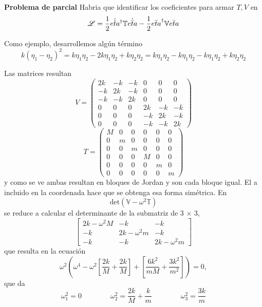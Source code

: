 \documentclass[10pt,oneside]{CBFT_book}
\begin{document}
\begin{ejemplo}{\bf Problema de parcial}
Habria que identificar los coeficientes para armar $T,V$ en 
\[
	\mathscr{L} = \frac{1}{2} \dot{\bar{eta}}^\dagger \mathbb{T} \dot{\bar{eta}} 
	- \frac{1}{2} \bar{eta}^\dagger \mathbb{V} \bar{eta}
\]

Como ejemplo, desarrollemos algún término
\[
	k(\eta_1 - \eta_2)^2 = k \eta_1 \eta_2 - 2k \eta_1 \eta_2 + k \eta_2 \eta_2 =
	k \eta_1 \eta_2 - k \eta_1 \eta_2 -  k \eta_1 \eta_2 + k \eta_2 \eta_2
\]

Las matrices resultan 
\[
	V = \begin{pmatrix}
	     2 k & -k & -k & 0 & 0 & 0 \\
	     -k & 2k & -k & 0 & 0 & 0 \\
	     -k & -k & 2k & 0 & 0 & 0 \\
	     0 & 0 & 0 & 2k & -k & -k \\
	     0 & 0 & 0 & -k & 2k & -k \\
	     0 & 0 & 0 & -k & -k & 2k
	    \end{pmatrix}
\]
\[
	T = \begin{pmatrix}
	     M & 0 & 0 & 0 & 0 & 0 \\
	     0 & m & 0 & 0 & 0 & 0 \\
	     0 & 0 & m & 0 & 0 & 0 \\
	     0 & 0 & 0 & M & 0 & 0 \\
	     0 & 0 & 0 & 0 & m & 0 \\
	     0 & 0 & 0 & 0 & 0 & m 
	    \end{pmatrix}
\]
y como se ve ambas resultan en bloques de Jordan y son cada bloque igual. El a incluido en la coordenada hace que se
obtenga esa forma simétrica.
En
\[
	\mbox{det}( \mathbb{V} - \omega^2 \mathbb{T} )
\]
se reduce a calcular el determinante de la submatriz de 3 $\times$ 3,
\[
	\begin{bmatrix}
	2 k - \omega^2 M & -k & -k \\
	-k & 2 k - \omega^2 m & -k \\
	-k & -k & 2 k - \omega^2 m 
	\end{bmatrix}
\]
que resulta en la ecuación 
\[
	\omega^2 \left( \omega^4 - \omega^2 \left[  \frac{2k}{M} + \frac{2k}{M} \right] +
	\left[ \frac{6k^2}{mM} + \frac{3k^2}{m^2} \right] \right) = 0,
\]
que da 
\[
	\omega_1^2 = 0 \qquad \qquad \omega_2^2 = \frac{2k}{M} + \frac{k}{m} \qquad \qquad \omega_3^2 = \frac{3k}{m} 
\]


\end{ejemplo}
\end{document}
